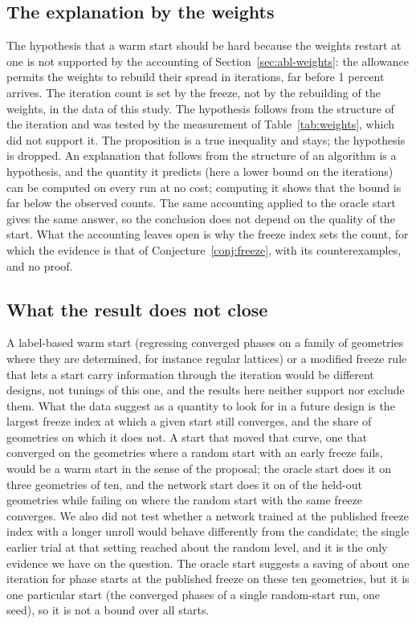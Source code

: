 \subsection{The explanation by the weights}\label{sec:error}

The hypothesis that a warm start should be hard because the weights restart at one is not supported by the accounting of Section~\ref{sec:abl-weights}: the allowance permits the weights to rebuild their spread in \wTwelveKMed{} iterations, far before 1 percent arrives. The iteration count is set by the freeze, not by the rebuilding of the weights, in the data of this study. The hypothesis follows from the structure of the iteration and was tested by the measurement of Table~\ref{tab:weights}, which did not support it. The proposition is a true inequality and stays; the hypothesis is dropped. An explanation that follows from the structure of an algorithm is a hypothesis, and the quantity it predicts (here a lower bound on the iterations) can be computed on every run at no cost; computing it shows that the bound is far below the observed counts. The same accounting applied to the oracle start gives the same answer, so the conclusion does not depend on the quality of the start. What the accounting leaves open is why the freeze index sets the count, for which the evidence is that of Conjecture~\ref{conj:freeze}, with its counterexamples, and no proof.

\subsection{What the result does not close}\label{sec:open}

A label-based warm start (regressing converged phases on a family of geometries where they are determined, for instance regular lattices) or a modified freeze rule that lets a start carry information through the iteration would be different designs, not tunings of this one, and the results here neither support nor exclude them. What the data suggest as a quantity to look for in a future design is the largest freeze index at which a given start still converges, and the share of geometries on which it does not. A start that moved that curve, one that converged on the geometries where a random start with an early freeze fails, would be a warm start in the sense of the proposal; the oracle start does it on three geometries of ten, and the network start does it on \capRNotN{} of the \nGeo{} held-out geometries while failing on \capNNotR{} where the random start with the same freeze converges. We also did not test whether a network trained at the published freeze index with a longer unroll would behave differently from the candidate; the single earlier trial at that setting reached about the random level, and it is the only evidence we have on the question. The oracle start suggests a saving of about one iteration for phase starts at the published freeze on these ten geometries, but it is one particular start (the converged phases of a single random-start run, one seed), so it is not a bound over all starts.
